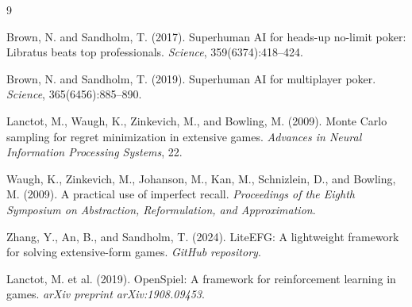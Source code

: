 \documentclass{article}
\begin{document}
\begin{thebibliography}{9}

Brown, N. and Sandholm, T. (2017).
Superhuman AI for heads-up no-limit poker: Libratus beats top professionals.
\textit{Science}, 359(6374):418--424.

Brown, N. and Sandholm, T. (2019).
Superhuman AI for multiplayer poker.
\textit{Science}, 365(6456):885--890.

Lanctot, M., Waugh, K., Zinkevich, M., and Bowling, M. (2009).
Monte Carlo sampling for regret minimization in extensive games.
\textit{Advances in Neural Information Processing Systems}, 22.

Waugh, K., Zinkevich, M., Johanson, M., Kan, M., Schnizlein, D., and Bowling, M. (2009).
A practical use of imperfect recall.
\textit{Proceedings of the Eighth Symposium on Abstraction, Reformulation, and Approximation}.

Zhang, Y., An, B., and Sandholm, T. (2024).
LiteEFG: A lightweight framework for solving extensive-form games.
\textit{GitHub repository}.

Lanctot, M. et al. (2019).
OpenSpiel: A framework for reinforcement learning in games.
\textit{arXiv preprint arXiv:1908.09453}.

\end{thebibliography}
\end{document}
